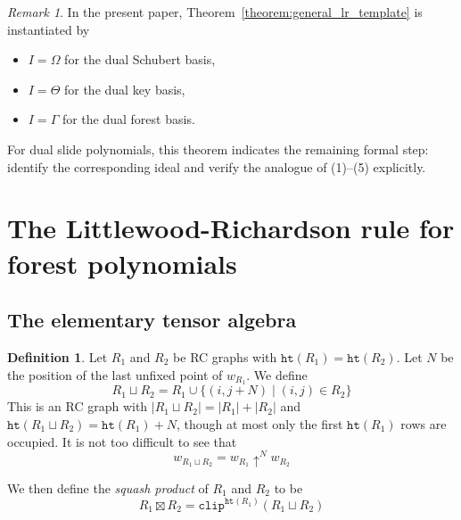 \documentclass{amsart}
\theoremstyle{definition}
\newtheorem{definition}[lemma]{Definition}
\theoremstyle{remark}
\newtheorem*{remark}{Remark}
\numberwithin{equation}{subsection}
\newcommand{\shup}{{\uparrow}}
\newcommand{\wof}[1]{w_{#1}}
\newcommand{\hr}{\mathtt{ht}}
\newcommand{\clp}{\mathtt{clip}}
\begin{document}
\begin{remark}
In the present paper, Theorem~\ref{theorem:general_lr_template} is instantiated by
\begin{itemize}
\item $I=\Omega$ for the dual Schubert basis,
\item $I=\Theta$ for the dual key basis,
\item $I=\Gamma$ for the dual forest basis.
\end{itemize}
For dual slide polynomials, this theorem indicates the remaining formal step: identify the corresponding ideal and verify the analogue of (1)--(5) explicitly.
\end{remark}

\section{The Littlewood-Richardson rule for forest polynomials}

\subsection{The elementary tensor algebra}
\begin{definition}
Let $R_1$ and $R_2$ be RC graphs with $\hr(R_1)=\hr(R_2)$. Let $N$ be the position of the last unfixed point of $\wof{R_1}$. We define
$$R_1\sqcup R_2 = R_1\cup \{(i,j+N)\mid (i,j)\in R_2\}$$
This is an RC graph with $|R_1\sqcup R_2| = |R_1| + |R_2|$ and $\hr(R_1\sqcup R_2)=\hr(R_1) + N$, though at most only the first $\hr(R_1)$ rows are occupied.  It is not too difficult to see that
$$\wof{R_1\sqcup R_2} = \wof{R_1}\shup^{N}\wof{R_2}$$

We then define the \emph{squash product} of $R_1$ and $R_2$ to be
$$R_1\boxtimes R_2 = \clp^{\hr(R_1)}(R_1\sqcup R_2)$$

\end{definition}
\end{document}
